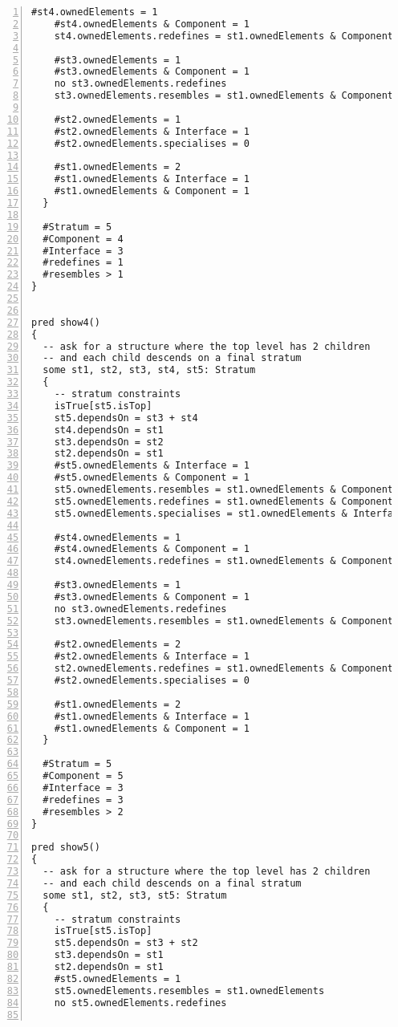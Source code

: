 \begin{lstlisting}[caption={test.als}, numbers=left]
    #st4.ownedElements = 1
    #st4.ownedElements & Component = 1
    st4.ownedElements.redefines = st1.ownedElements & Component

    #st3.ownedElements = 1
    #st3.ownedElements & Component = 1
    no st3.ownedElements.redefines
    st3.ownedElements.resembles = st1.ownedElements & Component

    #st2.ownedElements = 1
    #st2.ownedElements & Interface = 1
    #st2.ownedElements.specialises = 0
    
    #st1.ownedElements = 2
    #st1.ownedElements & Interface = 1
    #st1.ownedElements & Component = 1
  }
  
  #Stratum = 5
  #Component = 4
  #Interface = 3
  #redefines = 1
  #resembles > 1
}


pred show4()
{
  -- ask for a structure where the top level has 2 children
  -- and each child descends on a final stratum
  some st1, st2, st3, st4, st5: Stratum
  {
    -- stratum constraints
    isTrue[st5.isTop]
    st5.dependsOn = st3 + st4
    st4.dependsOn = st1
    st3.dependsOn = st2
    st2.dependsOn = st1
    #st5.ownedElements & Interface = 1
    #st5.ownedElements & Component = 1
    st5.ownedElements.resembles = st1.ownedElements & Component
    st5.ownedElements.redefines = st1.ownedElements & Component
    st5.ownedElements.specialises = st1.ownedElements & Interface
    
    #st4.ownedElements = 1
    #st4.ownedElements & Component = 1
    st4.ownedElements.redefines = st1.ownedElements & Component

    #st3.ownedElements = 1
    #st3.ownedElements & Component = 1
    no st3.ownedElements.redefines
    st3.ownedElements.resembles = st1.ownedElements & Component

    #st2.ownedElements = 2
    #st2.ownedElements & Interface = 1
    st2.ownedElements.redefines = st1.ownedElements & Component  
    #st2.ownedElements.specialises = 0
    
    #st1.ownedElements = 2
    #st1.ownedElements & Interface = 1
    #st1.ownedElements & Component = 1
  }
  
  #Stratum = 5
  #Component = 5
  #Interface = 3
  #redefines = 3
  #resembles > 2
}

pred show5()
{
  -- ask for a structure where the top level has 2 children
  -- and each child descends on a final stratum
  some st1, st2, st3, st5: Stratum
  {
    -- stratum constraints
    isTrue[st5.isTop]
    st5.dependsOn = st3 + st2
    st3.dependsOn = st1
    st2.dependsOn = st1
    #st5.ownedElements = 1
    st5.ownedElements.resembles = st1.ownedElements
    no st5.ownedElements.redefines
    

\end{lstlisting}
